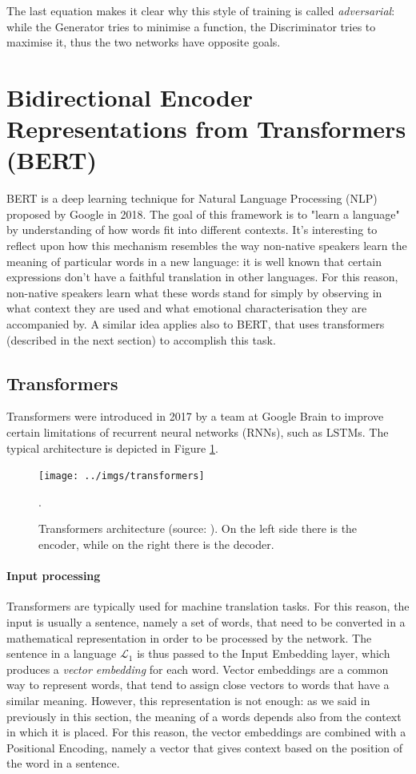 \documentclass[12pt,a4paper]{book}
\theoremstyle{definition}
\begin{document}
	The last equation makes it clear why this style of training is called \textit{adversarial}: while the Generator tries to minimise a function, the Discriminator tries to maximise it, thus the two networks have opposite goals.
	
	\section{Bidirectional Encoder Representations from Transformers (BERT)}
	BERT \cite{Devlin2018} is a deep learning technique for Natural Language Processing (NLP) proposed by Google in 2018. The goal of this framework is to "learn a language" by understanding of how words fit into different contexts. It's interesting to reflect upon how this mechanism resembles the way non-native speakers learn the meaning of particular words in a new language: it is well known that certain expressions don't have a faithful translation in other languages. For this reason, non-native speakers learn what these words stand for simply by observing in what context they are used and what emotional characterisation they are accompanied by. A similar idea applies also to BERT, that uses transformers (described in the next section) to accomplish this task.
	
	\subsection{Transformers}
	Transformers \cite{Vaswani2017} were introduced in 2017 by a team at Google Brain to improve certain limitations of recurrent neural networks (RNNs), such as LSTMs. The typical architecture is depicted in Figure \ref{fig:transformer}.
	\begin{figure}[!ht]
		\centering
		\texttt{[image: ../imgs/transformers]}
		\captionsetup{width=.7\linewidth}
		\caption{Transformers architecture (source: \cite{Vaswani2017}). On the left side there is the encoder, while on the right there is the decoder.}
		\label{fig:transformer}.
	\end{figure}
	
	\paragraph{Input processing}
	Transformers are typically used for machine translation tasks. For this reason, the input is usually a sentence, namely a set of words, that need to be converted in a mathematical representation in order to be processed by the network. The sentence in a language $\mathcal{L}_1$ is thus passed to the Input Embedding layer, which produces a \textit{vector embedding} for each word. Vector embeddings are a common way to represent words, that tend to assign close vectors to words that have a similar meaning. However, this representation is not enough: as we said in previously in this section, the meaning of a words depends also from the context in which it is placed. For this reason, the vector embeddings are combined with a Positional Encoding, namely a vector that gives context based on the position of the word in a sentence. 
	
\end{document}
